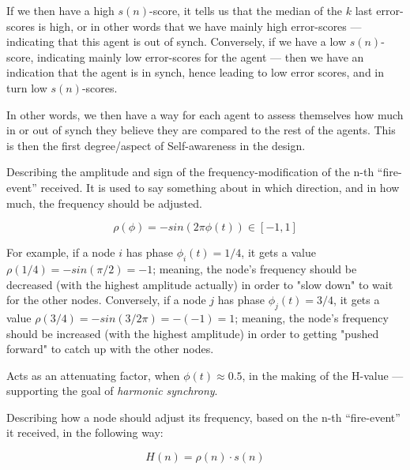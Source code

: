 			If we then have a high $s(n)$-score, it tells us that the median of the $k$ last error-scores is high, or in other words that we have mainly high error-scores — indicating that this agent is out of synch. Conversely, if we have a low $s(n)$-score, indicating mainly low error-scores for the agent — then we have an indication that the agent is in synch, hence leading to low error scores, and in turn low $s(n)$-scores. 
			
			In other words, we then have a way for each agent to assess themselves how much in or out of synch they believe they are compared to the rest of the agents. This is then the first degree/aspect of  Self-awareness in the design.
			
			
			Describing the amplitude and sign of the frequency-modification of the n-th ``fire-event'' received. It is used to say something about in which direction, and in how much, the frequency should be adjusted.
			
			\begin{equation}
			\label{amp_sign_freq_adj}
				\rho(\phi) = - sin(2\pi\phi(t)) \in [-1, 1]
			\end{equation}
			
			For example, if a node $i$ has phase $\phi_i(t)=1/4$, it gets a value $\rho(1/4) = - sin(\pi/2) = -1$; meaning, the node's frequency should be decreased (with the highest amplitude actually) in order to "slow down" to wait for the other nodes. Conversely, if a node $j$ has phase $\phi_j(t)=3/4$, it gets a value $\rho(3/4) = - sin(3/2 \pi) = -(-1) = 1$; meaning, the node's frequency should be increased (with the highest amplitude) in order to getting "pushed forward" to catch up with the other nodes.
			
			Acts as an attenuating factor, when $\phi(t)\approx0.5$, in the making of the H-value — supporting the goal of \textit{harmonic synchrony}.

			
			Describing how a node should adjust its frequency, based on the n-th ``fire-event'' it received, in the following way:
			
			\begin{equation}
			\label{h_value}
				H(n) = \rho(n) \cdot s(n)
			\end{equation}
			
